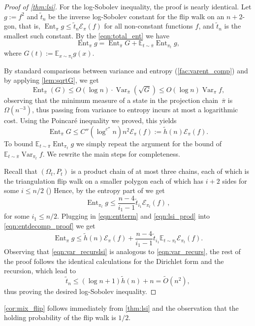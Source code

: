 \documentclass[a4paper, 12p]{article}
\numberwithin{equation}{section}
\newcommand{\Exp}{\mathbb{E}}
\newcommand{\piproj}{\overline{\pi}}
\newcommand{\var}{\operatorname{Var}}
\newcommand{\dir}{\mathcal{E}}
\newcommand{\ent}{\operatorname{Ent}}
\begin{document}
\begin{proof}[Proof of \cref{thm:lsi}]
For the log-Sobolev inequality, the proof is nearly identical. Let $g:=f^2$ and $\tilde t_n$ be the inverse log-Sobolev constant for the flip walk on an $n+2$-gon, that is, $\ent_\pi g\leq\tilde t_n\dir_\pi(f)$ for all non-constant functions $f$, and $\tilde t_n$ is the smallest such constant. By the \ref{eqn:total_ent} we have
\begin{equation}\label{eqn:entdecomp_proof}
    \ent_{\pi} g = \ent_{\piproj} G + \Exp_{t \sim \piproj} \ent_{\pi_t} g,
\end{equation}
where $G(t):=\Exp_{x\sim\pi_t}g(x)$.

By standard comparisons between variance and entropy (\cref{fac:varent_comp}) and by applying \cref{lem:sqrtG}, we get
\[\ent_{\bar\pi}(G) \le O(\log n) \cdot \var_{\bar\pi}(\sqrt{G}) \le O(\log n) \var_{\pi} f,\]
observing that the minimum measure of a state in the projection chain~$\piproj$ is $\Omega(n^{-3})$, thus passing from variance to entropy incurs at most a logarithmic cost. Using the Poincar\'e inequality we proved, this yields
\begin{equation}\label{eqn:entterm}
    \ent_{\piproj} G\leq C''(\log^{c''}n)n^{2}\dir_\pi(f):=\tilde{h}(n)\dir_\pi(f).
\end{equation}
To bound $\Exp_{t\sim\piproj}\ent_{\pi_t} g$ we simply repeat the argument for the bound of $\Exp_{t\sim\piproj}\var_{\pi_t} f$. We rewrite the main steps for completeness.

Recall that $(\Omega_t, P_t)$ is a product chain of at most three chains, each of which is the triangulation flip walk on a smaller polygon each of which has $i+2$ sides for some $i\leq n/2$ ()
Hence, by the entropy part of  we get
\begin{equation}\label{eqn:lsi_prod}
\ent_{\pi_t}g\leq \frac{n-4}{i_1-1}\tilde t_{i_1}\dir_{\pi_t}(f)\,,
\end{equation}
for some $i_1\leq n/2$.
Plugging in \eqref{eqn:entterm} and \eqref{eqn:lsi_prod} into \eqref{eqn:entdecomp_proof} we get
\begin{equation}\label{eqn:var_recurslsi}
    \ent_\pi g \leq \tilde h(n)\dir_\pi(f)+\frac{n-4}{i_1-1}\tilde t_{i_1}\Exp_{t\sim\pi_t}\dir_{\pi_t}(f).
\end{equation}
Observing that \eqref{eqn:var_recurslsi} is analogous to \eqref{eqn:var_recurs}, the rest of the proof follows the identical calculations for the Dirichlet form and the recursion, which lead to
$$\tilde t_n\leq (\log n+1)\tilde{h}(n)+n=\widetilde O(n^{2}),$$
thus proving the desired log-Sobolev inequality.
\end{proof}
\cref{cor:mix_flip} follows immediately from \cref{thm:lsi} and the observation that the holding probability of the flip walk is $1/2$.
\end{document}
